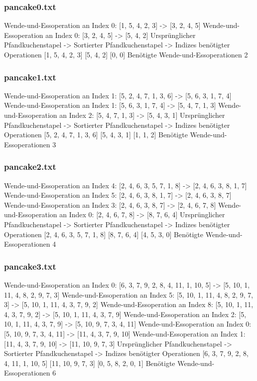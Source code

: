 \subsubsection{pancake0.txt}
{\obeylines

Wende-und-Essoperation an Index 0: [1, 5, 4, 2, 3] -> [3, 2, 4, 5]
    Wende-und-Essoperation an Index 0: [3, 2, 4, 5] -> [5, 4, 2]
    Ursprünglicher Pfandkuchenstapel -> Sortierter Pfandkuchenstapel -> Indizes benötigter Operationen
    [1, 5, 4, 2, 3]
    [5, 4, 2]
    [0, 0]
    Benötigte Wende-und-Essoperationen 2
    \subsubsection{pancake1.txt}

    Wende-und-Essoperation an Index 1: [5, 2, 4, 7, 1, 3, 6] -> [5, 6, 3, 1, 7, 4]
    Wende-und-Essoperation an Index 1: [5, 6, 3, 1, 7, 4] -> [5, 4, 7, 1, 3]
    Wende-und-Essoperation an Index 2: [5, 4, 7, 1, 3] -> [5, 4, 3, 1]
    Ursprünglicher Pfandkuchenstapel -> Sortierter Pfandkuchenstapel -> Indizes benötigter Operationen
    [5, 2, 4, 7, 1, 3, 6]
    [5, 4, 3, 1]
    [1, 1, 2]
    Benötigte Wende-und-Essoperationen 3
    \subsubsection{pancake2.txt}

    Wende-und-Essoperation an Index 4: [2, 4, 6, 3, 5, 7, 1, 8] -> [2, 4, 6, 3, 8, 1, 7]
    Wende-und-Essoperation an Index 5: [2, 4, 6, 3, 8, 1, 7] -> [2, 4, 6, 3, 8, 7]
    Wende-und-Essoperation an Index 3: [2, 4, 6, 3, 8, 7] -> [2, 4, 6, 7, 8]
    Wende-und-Essoperation an Index 0: [2, 4, 6, 7, 8] -> [8, 7, 6, 4]
    Ursprünglicher Pfandkuchenstapel -> Sortierter Pfandkuchenstapel -> Indizes benötigter Operationen
    [2, 4, 6, 3, 5, 7, 1, 8]
    [8, 7, 6, 4]
    [4, 5, 3, 0]
    Benötigte Wende-und-Essoperationen 4
    \subsubsection{pancake3.txt}

    Wende-und-Essoperation an Index 0: [6, 3, 7, 9, 2, 8, 4, 11, 1, 10, 5] -> [5, 10, 1, 11, 4, 8, 2, 9, 7, 3]
    Wende-und-Essoperation an Index 5: [5, 10, 1, 11, 4, 8, 2, 9, 7, 3] -> [5, 10, 1, 11, 4, 3, 7, 9, 2]
    Wende-und-Essoperation an Index 8: [5, 10, 1, 11, 4, 3, 7, 9, 2] -> [5, 10, 1, 11, 4, 3, 7, 9]
    Wende-und-Essoperation an Index 2: [5, 10, 1, 11, 4, 3, 7, 9] -> [5, 10, 9, 7, 3, 4, 11]
    Wende-und-Essoperation an Index 0: [5, 10, 9, 7, 3, 4, 11] -> [11, 4, 3, 7, 9, 10]
    Wende-und-Essoperation an Index 1: [11, 4, 3, 7, 9, 10] -> [11, 10, 9, 7, 3]
    Ursprünglicher Pfandkuchenstapel -> Sortierter Pfandkuchenstapel -> Indizes benötigter Operationen
    [6, 3, 7, 9, 2, 8, 4, 11, 1, 10, 5]
    [11, 10, 9, 7, 3]
    [0, 5, 8, 2, 0, 1]
    Benötigte Wende-und-Essoperationen 6
}
